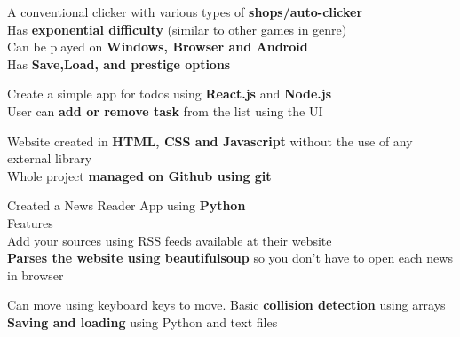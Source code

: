 \documentclass[]{Nikhil_Kadiyan_Resume}
\begin{document}
\pt A conventional clicker with various types of \textbf{shops/auto-clicker}\\
\pt Has \textbf{exponential difficulty} (similar to other games in genre) \\
\pt Can be played on \textbf{Windows, Browser and Android}\\
\pt Has \textbf{Save,Load, and prestige options}\\
\sectionsep

\pt Create a simple app for todos using \textbf{React.js} and \textbf{Node.js} \\
\pt User can \textbf{add or remove task} from the list using the UI
\sectionsep

\pt Website created in \textbf{HTML, CSS and Javascript} without the use of any external library \\
\pt Whole project \textbf{managed on Github using git} \\
\sectionsep

\pt Created a News Reader App using \textbf{Python} \\
\pt Features \\
\hspace{5mm} \pt Add your sources using RSS feeds available at their website \\
\hspace{5mm} \pt \textbf{Parses the website using beautifulsoup} so you don't have to open each news in browser \\
\sectionsep

\pt Can move using keyboard keys to move. Basic \textbf{collision detection} using arrays \\
\pt \textbf{Saving and loading} using Python and text files \\
\sectionsep
\end{document}
